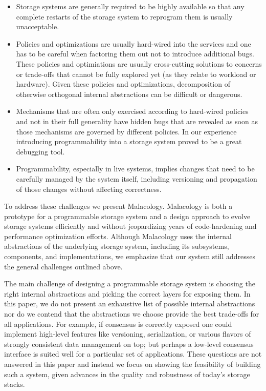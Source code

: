 \documentclass[preprint]{sigplanconf-eurosys}
\begin{document}
\begin{itemize}
	
\item Storage systems are generally required to be highly available so that any
complete restarts of the storage system to reprogram them is usually
unacceptable. 

\item Policies and optimizations are usually hard-wired into the services and
one has to be careful when factoring them out not to introduce additional bugs.
These policies and optimiations are usually cross-cutting solutions to concerns
or trade-offs that cannot be fully explored yet (as they relate to workload or
hardware). Given these policies and optimizations, decomposition of otherwise
orthogonal internal abstractions can be difficult or dangerous.

\item Mechanisms that are often only exercised according to hard-wired policies
and not in their full generality have hidden bugs that are revealed as soon as
those mechanisms are governed by different policies. In our experience
introducing programmability into a storage system proved to be a great
debugging tool.

\item Programmability, especially in live systems, implies changes that need to
be carefully managed by the system itself, including versioning and propagation
of those changes without affecting correctness.

\end{itemize}

To address these challenges we present Malacology. Malacology is both a
prototype for a programmable storage system and a design approach to evolve
storage systems efficiently and without jeopardizing years of code-hardening
and performance optimization efforts.  Although Malacology uses the internal
abstractions of the underlying storage system, including its subsystems,
components, and implementations, we emphasize that our system still addresses
the general challenges outlined above.

The main challenge of designing a programmable storage system is choosing the
right internal abstractions and picking the correct layers for exposing them.
In this paper, we do not present an exhaustive list of possible internal
abstractions nor do we contend that the abstractions we choose provide the best
trade-offs for all applications.  For example, if consensus is correctly
exposed one could implement high-level features like versioning, serialization,
or various flavors of strongly consistent data management on top; but perhaps a
low-level consensus interface is suited well for a particular set of
applications.  These questions are not answered in this paper and instead we
focus on showing the feasibility of building such a system, given advances in
the quality and robustness of today's storage stacks.
\end{document}
